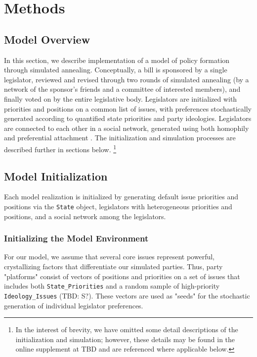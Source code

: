 \documentclass[pdftex,12pt]{llncs}
\begin{document}
\section{Methods}
%
%

\subsection{Model Overview}
In this section, we describe implementation of a model of policy formation through simulated annealing.
Conceptually, a bill is sponsored by a single legislator, reviewed and revised through two rounds of simulated annealing (by a network of the sponsor's friends and a committee of interested members), and finally voted on by the entire legislative body.
Legislators are initialized with priorities and positions on a common list of issues, with preferences stochastically generated according to quantified state priorities and party ideologies.
Legislators are connected to each other in a social network, generated using both homophily \parencite{msc01, br11} and preferential attachment \parencite{Barabasi1999}.
The initialization and simulation processes are described further in sections below.
\footnote{In the interest of brevity, we have omitted some detail descriptions of the initialization and simulation; however, these details may be found in the online supplement at TBD and are referenced where applicable below.}

\subsection{Model Initialization}
Each model realization is initialized by generating default issue priorities and positions via the \texttt{State} object, legislators with heterogeneous priorities and positions, and a social network among the legislators.

\subsubsection{Initializing the Model Environment}
For our model, we assume that several core issues represent powerful, crystallizing factors that differentiate our simulated parties.
Thus, party "platforms" consist of vectors of positions and priorities on a set of issues that includes both \texttt{State\_Priorities} and a random sample of high-priority \texttt{Ideology\_Issues} (TBD: S?).
These vectors are used as "seeds" for the stochastic generation of individual legislator preferences.
\end{document}

